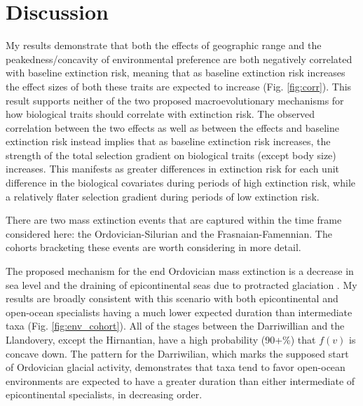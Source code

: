 \documentclass[12pt,letterpaper]{article}
\begin{document}
\section{Discussion}

My results demonstrate that both the effects of geographic range and the peakedness/concavity of environmental preference are both negatively correlated with baseline extinction risk, meaning that as baseline extinction risk increases the effect sizes of both these traits are expected to increase (Fig. \ref{fig:corr}). This result supports neither of the two proposed macroevolutionary mechanisms for how biological traits should correlate with extinction risk. The observed correlation between the two effects as well as between the effects and baseline extinction risk instead implies that as baseline extinction risk increases, the strength of the total selection gradient on biological traits (except body size) increases. This manifests as greater differences in extinction risk for each unit difference in the biological covariates during periods of high extinction risk, while a relatively flater selection gradient during periods of low extinction risk.

There are two mass extinction events that are captured within the time frame considered here: the Ordovician-Silurian and the Frasnaian-Famennian. The cohorts bracketing these events are worth considering in more detail.


The proposed mechanism for the end Ordovician mass extinction is a decrease in sea level and the draining of epicontinental seas due to protracted glaciation \citep{Sheehan2001b,Johnson1974}. My results are broadly consistent with this scenario with both epicontinental and open-ocean specialists having a much lower expected duration than intermediate taxa (Fig. \ref{fig:env_cohort}). All of the stages between the Darriwillian and the Llandovery, except the Hirnantian, have a high probability (90+\%) that \(f(v)\) is concave down. The pattern for the Darriwilian, which marks the supposed start of Ordovician glacial activity, demonstrates that taxa tend to favor open-ocean environments are expected to have a greater duration than either intermediate of epicontinental specialists, in decreasing order.
\end{document}

